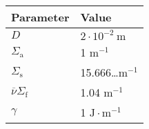 
\begin{tabular}{l l}
    \toprule

    Parameter          & Value  \\

    \midrule

    $ D $                                   & $ 2 \cdot 10^{-2} \ \text{m} $ \\
    $ \Sigma_{\text{a}} $                   & 1 $ \text{m}^{-1} $ \\
    $ \Sigma_{\text{s}} $                   & 15.666\dots $ \text{m}^{-1} $ \\
    $ \overline{\nu} \Sigma_{\text{f}} $    & 1.04 $ \text{m}^{-1} $ \\
    $ \gamma $                              & 1 $ \text{J}\cdot \text{m}^{-1} $ \\

    \bottomrule
\end{tabular}
